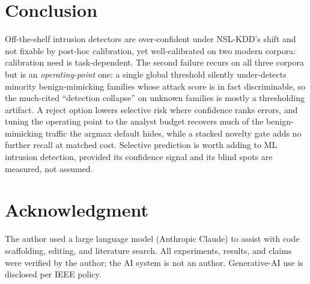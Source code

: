 \documentclass[conference,a4paper]{IEEEtran}
\begin{document}
\section{Conclusion}
Off-the-shelf intrusion detectors are over-confident under NSL-KDD's shift and not fixable by post-hoc
calibration, yet well-calibrated on two modern corpora: calibration need is task-dependent. The second
failure recurs on all three corpora but is an \emph{operating-point} one: a single global threshold
silently under-detects minority benign-mimicking families whose attack score is in fact discriminable, so
the much-cited ``detection collapse'' on unknown families is mostly a thresholding artifact. A reject
option lowers selective risk where confidence ranks errors, and tuning the operating point to the analyst
budget recovers much of the benign-mimicking traffic the argmax default hides, while a stacked novelty gate
adds no further recall at matched cost. Selective prediction is worth adding to ML intrusion detection,
provided its confidence signal and its blind spots are measured, not assumed.

\section*{Acknowledgment}
The author used a large language model (Anthropic Claude) to assist with code scaffolding, editing,
and literature search. All experiments, results, and claims were verified by the author; the AI
system is not an author. Generative-AI use is disclosed per IEEE policy.

\linespread{1}\selectfont


\end{document}
